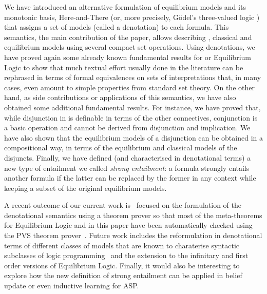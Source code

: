 \documentclass{tlp}
\begin{document}
We have introduced an alternative formulation of equilibrium models and its monotonic basis, Here-and-There (or, more precisely, G\"odel's three-valued logic ) that assigns a set of models (called a denotation) to each formula. This semantics, the main contribution of the paper, allows describing , classical and equilibrium models using several compact set operations. Using denotations, we have proved again some already known fundamental results for  or Equilibrium Logic to show that much textual effort usually done in the literature can be rephrased in terms of formal equivalences on sets of interpretations that, in many cases, even amount to simple properties from standard set theory. On the other hand, as side contributions or applications of this semantics, we have also obtained some additional fundamental results. For instance, we have proved that, while disjunction in  is definable in terms of the other connectives, conjunction is a basic operation and cannot be derived from disjunction and implication. We have also shown that the equilibrium models of a disjunction can be obtained in a compositional way, in terms of the equilibrium and classical models of the disjuncts. Finally, we have defined (and characterised in denotational terms) a new type of entailment we called \emph{strong entailment}: a formula strongly entails another formula if the latter can be replaced by the former in any context while keeping a subset of the original equilibrium models.

A recent outcome of our current work is~\cite{CMMSE15} focused on the formulation of the denotational semantics using a theorem prover so that most of the meta-theorems for Equilibrium Logic and  in this paper have been automatically checked using the PVS theorem prover~\cite{PVS92}. Future work includes the reformulation in denotational terms of different classes of models that are known to charaterise syntactic subclasses of logic programming~\cite{FINK11,FINK13} and the extension to the infinitary and first order versions of Equilibrium Logic. Finally, it would also be interesting to explore how the new definition of strong entailment can be applied in belief update or even inductive learning for ASP.

\newpage


\end{document}
